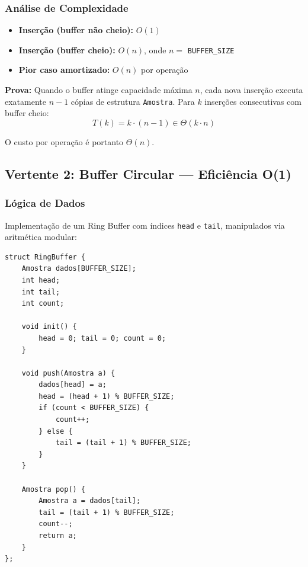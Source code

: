\documentclass[12pt, a4paper]{article}
\begin{document}
\subsubsection{Análise de Complexidade}

\begin{itemize}
    \item \textbf{Inserção (buffer não cheio):} $O(1)$
    \item \textbf{Inserção (buffer cheio):} $O(n)$, onde $n = $ \texttt{BUFFER\_SIZE}
    \item \textbf{Pior caso amortizado:} $O(n)$ por operação
\end{itemize}

\textbf{Prova:} Quando o buffer atinge capacidade máxima $n$, cada nova inserção executa exatamente $n-1$ cópias de estrutura \texttt{Amostra}. Para $k$ inserções consecutivas com buffer cheio:
\[
T(k) = k \cdot (n - 1) \in \Theta(k \cdot n)
\]

O custo por operação é portanto $\Theta(n)$.

\subsection{Vertente 2: Buffer Circular --- Eficiência O(1)}

\subsubsection{Lógica de Dados}

Implementação de um Ring Buffer com índices \texttt{head} e \texttt{tail}, manipulados via aritmética modular:

\begin{lstlisting}[caption={Estrutura do Buffer Circular (Ring Buffer)}]
struct RingBuffer {
    Amostra dados[BUFFER_SIZE];
    int head;
    int tail;
    int count;

    void init() {
        head = 0; tail = 0; count = 0;
    }

    void push(Amostra a) {
        dados[head] = a;
        head = (head + 1) % BUFFER_SIZE;
        if (count < BUFFER_SIZE) {
            count++;
        } else {
            tail = (tail + 1) % BUFFER_SIZE;
        }
    }

    Amostra pop() {
        Amostra a = dados[tail];
        tail = (tail + 1) % BUFFER_SIZE;
        count--;
        return a;
    }
};
\end{lstlisting}
\end{document}
